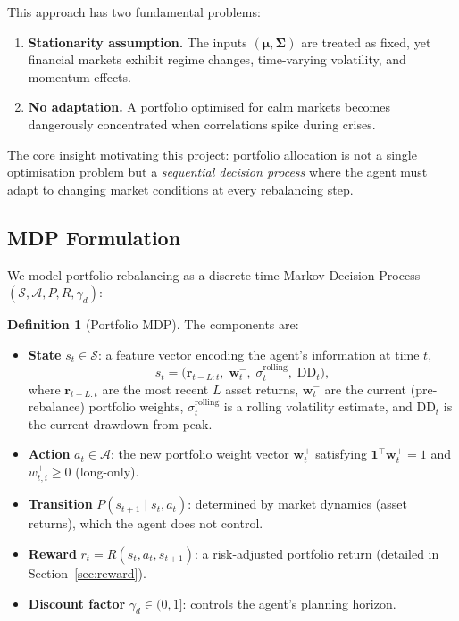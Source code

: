 \documentclass[11pt, a4paper]{article}
\theoremstyle{definition}
\newtheorem{definition}{Definition}[section]
\theoremstyle{plain}
\theoremstyle{remark}
\begin{document}
This approach has two fundamental problems:
\begin{enumerate}[label=(\roman*)]
    \item \textbf{Stationarity assumption.} The inputs $(\bm{\mu}, \bm{\Sigma})$
          are treated as fixed, yet financial markets exhibit regime changes,
          time-varying volatility, and momentum effects.
    \item \textbf{No adaptation.} A portfolio optimised for calm markets becomes
          dangerously concentrated when correlations spike during crises.
\end{enumerate}

\begin{keyidea}
The core insight motivating this project: portfolio allocation is not a
single optimisation problem but a \emph{sequential decision process} where
the agent must adapt to changing market conditions at every rebalancing step.
\end{keyidea}

\subsection{MDP Formulation}

We model portfolio rebalancing as a discrete-time Markov Decision Process
$(\mathcal{S}, \mathcal{A}, P, R, \gamma_d)$:

\begin{definition}[Portfolio MDP]
\label{def:portfolio_mdp}
The components are:
\begin{itemize}[leftmargin=2em]
    \item \textbf{State} $s_t \in \mathcal{S}$: a feature vector encoding the
          agent's information at time $t$,
          \[
              s_t = \bigl(\bm{r}_{t-L:t},\; \bm{w}_{t}^{-},\;
              \sigma_{t}^{\text{rolling}},\; \text{DD}_t\bigr),
          \]
          where $\bm{r}_{t-L:t}$ are the most recent $L$ asset returns,
          $\bm{w}_t^{-}$ are the current (pre-rebalance) portfolio weights,
          $\sigma_t^{\text{rolling}}$ is a rolling volatility estimate, and
          $\text{DD}_t$ is the current drawdown from peak.

    \item \textbf{Action} $a_t \in \mathcal{A}$: the new portfolio weight
          vector $\bm{w}_t^{+}$ satisfying $\bm{1}^\top \bm{w}_t^{+} = 1$
          and $w_{t,i}^{+} \geq 0$ (long-only).

    \item \textbf{Transition} $P(s_{t+1} \mid s_t, a_t)$: determined by
          market dynamics (asset returns), which the agent does not control.

    \item \textbf{Reward} $r_t = R(s_t, a_t, s_{t+1})$: a risk-adjusted
          portfolio return (detailed in Section~\ref{sec:reward}).

    \item \textbf{Discount factor} $\gamma_d \in (0, 1]$: controls the
          agent's planning horizon.
\end{itemize}
\end{definition}
\end{document}
